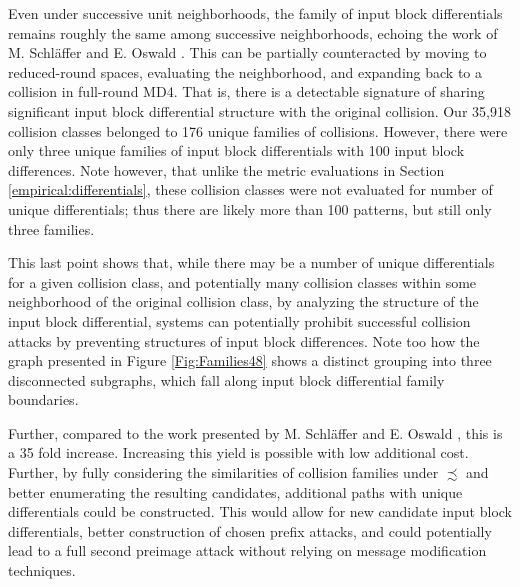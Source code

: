 \documentclass[conference]{IEEEtran}
\begin{document}
Even under successive unit neighborhoods, the family of input block
differentials remains roughly the same among successive neighborhoods,
echoing the work of M. Schl{\"a}ffer and E. Oswald \cite{Schlaffer2006}.
This can be partially counteracted by moving to reduced-round spaces,
evaluating the neighborhood, and expanding back to a collision in
full-round MD4. That is, there is a detectable signature of sharing
significant input block differential structure with the original
collision. Our 35,918 collision classes belonged to 176 unique
families of collisions. However, there were only three unique families
of input block differentials with 100 input block differences. Note
however, that unlike the metric evaluations in
Section \ref{empirical:differentials}, these collision classes were
not evaluated for number of unique differentials; thus there are likely
more than 100 patterns, but still only three families.

This last point shows that, while there may be a number of unique differentials
for a given collision class, and potentially many collision classes within
some neighborhood of the original collision class, by analyzing the structure
of the input block differential, systems can potentially prohibit successful
collision attacks by preventing structures of input block differences. Note
too how the graph presented in Figure \ref{Fig:Families48} shows a distinct grouping
into three disconnected subgraphs, which fall along input block differential
family boundaries.

Further, compared to the work presented by M. Schl{\"a}ffer and E. Oswald
\cite{Schlaffer2006}, this is a 35 fold increase. Increasing this yield is
possible with low additional cost. Further, by fully considering the
similarities of collision families under $\precsim$ and better enumerating the
resulting candidates, additional paths with unique differentials could be
constructed. This would allow for new candidate input block differentials,
better construction of chosen prefix attacks, and could potentially lead to a full second
preimage attack without relying on message modification techniques.

%
%
\end{document}
